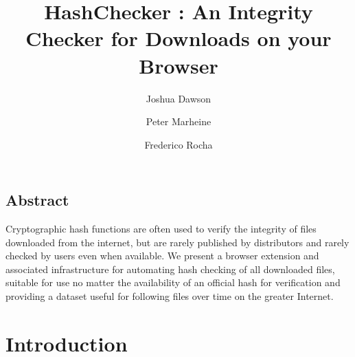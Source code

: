 \documentclass[letterpaper,twocolumn,10pt]{article}
\begin{document}
\date{}

\title{\Large \bf HashChecker : An Integrity Checker for Downloads on your Browser}

\author{
{\rm Joshua Dawson}
\and
{\rm Peter Marheine}
\and
{\rm Frederico Rocha}
} %

\maketitle


\subsection*{Abstract}

Cryptographic hash functions are often used to verify the integrity of files downloaded from the internet, but are rarely published by distributors and rarely checked by users even when available. We present a browser extension and associated infrastructure for automating hash checking of all downloaded files, suitable for use no matter the availability of an official hash for verification and providing a dataset useful for following files over time on the greater Internet.

\section{Introduction}
\end{document}
